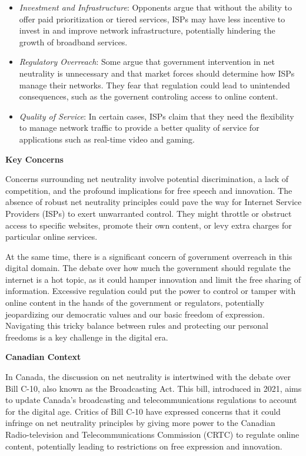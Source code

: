\documentclass[
]{book}
\providecommand{\tightlist}{%
  \setlength{\itemsep}{0pt}\setlength{\parskip}{0pt}}
\theoremstyle{definition}
\theoremstyle{definition}
\theoremstyle{definition}
\theoremstyle{definition}
\theoremstyle{remark}
\begin{document}
\begin{itemize}
\tightlist
\item
  \emph{Investment and Infrastructure}: Opponents argue that without the ability to offer paid prioritization or tiered services, ISPs may have less incentive to invest in and improve network infrastructure, potentially hindering the growth of broadband services.\\
\item
  \emph{Regulatory Overreach}: Some argue that government intervention in net neutrality is unnecessary and that market forces should determine how ISPs manage their networks. They fear that regulation could lead to unintended consequences, such as the governent controling access to online content.\\
\item
  \emph{Quality of Service}: In certain cases, ISPs claim that they need the flexibility to manage network traffic to provide a better quality of service for applications such as real-time video and gaming.
\end{itemize}

\textbf{Key Concerns}

Concerns surrounding net neutrality involve potential discrimination, a lack of competition, and the profound implications for free speech and innovation. The absence of robust net neutrality principles could pave the way for Internet Service Providers (ISPs) to exert unwarranted control. They might throttle or obstruct access to specific websites, promote their own content, or levy extra charges for particular online services.

At the same time, there is a significant concern of government overreach in this digital domain. The debate over how much the government should regulate the internet is a hot topic, as it could hamper innovation and limit the free sharing of information. Excessive regulation could put the power to control or tamper with online content in the hands of the government or regulators, potentially jeopardizing our democratic values and our basic freedom of expression. Navigating this tricky balance between rules and protecting our personal freedoms is a key challenge in the digital era.

\textbf{Canadian Context}

In Canada, the discussion on net neutrality is intertwined with the debate over Bill C-10, also known as the Broadcasting Act. This bill, introduced in 2021, aims to update Canada's broadcasting and telecommunications regulations to account for the digital age. Critics of Bill C-10 have expressed concerns that it could infringe on net neutrality principles by giving more power to the Canadian Radio-television and Telecommunications Commission (CRTC) to regulate online content, potentially leading to restrictions on free expression and innovation.
\end{document}

